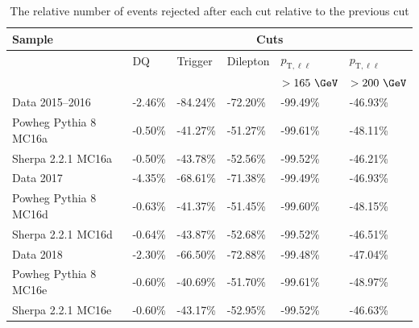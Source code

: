\begin{table}[h!]
  \centering
  \begin{tabular}{l|l|l|l|l|l}
  \hline\hline
  \textbf{Sample} & \multicolumn{5}{c}{\textbf{Cuts}} \\ \hline
    & DQ & Trigger & Dilepton & $p_{\text{T},\ell\ell}$ & $p_{\text{T},\ell\ell}$ \\
    &  &  &  & $>165~\GeV$ & $>200~\GeV$ \\ \hline\hline
   Data 2015--2016 & -2.46\% & -84.24\% & -72.20\% & -99.49\% & -46.93\% \\ \hline
   Powheg Pythia 8 MC16a & -0.50\% & -41.27\% & -51.27\% & -99.61\% & -48.11\% \\ \hline
   Sherpa 2.2.1 MC16a & -0.50\% & -43.78\% & -52.56\% & -99.52\% & -46.21\% \\ \hline\hline
   Data 2017 & -4.35\% & -68.61\% & -71.38\% & -99.49\% & -46.93\% \\ \hline
   Powheg Pythia 8 MC16d & -0.63\% & -41.37\% & -51.45\% & -99.60\% & -48.15\% \\ \hline
   Sherpa 2.2.1 MC16d & -0.64\% & -43.87\% & -52.68\% & -99.52\% & -46.51\% \\ \hline\hline
   Data 2018 & -2.30\% & -66.50\% & -72.88\% & -99.48\% & -47.04\% \\ \hline
   Powheg Pythia 8 MC16e & -0.60\% & -40.69\% & -51.70\% & -99.61\% & -48.97\% \\ \hline
   Sherpa 2.2.1 MC16e & -0.60\% & -43.17\% & -52.95\% & -99.52\% & -46.63\% \\ \hline\hline
   \end{tabular}
   \caption{The relative number of events rejected after each cut relative to the previous cut}
   \label{tab:RelCF}
\end{table}

